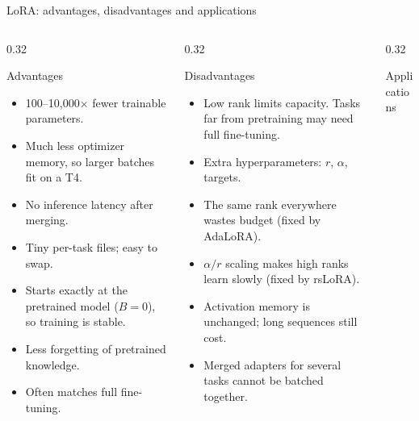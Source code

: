 \documentclass[aspectratio=169,11pt]{beamer}
\begin{document}
\begin{frame}{LoRA: advantages, disadvantages and applications}
  \begin{columns}[T]
    \begin{column}{0.32\textwidth}
      \begin{exampleblock}{Advantages}
        \scriptsize
        \begin{itemize}
          \item 100--10,000$\times$ fewer trainable parameters.
          \item Much less optimizer memory, so larger batches fit on a T4.
          \item No inference latency after merging.
          \item Tiny per-task files; easy to swap.
          \item Starts exactly at the pretrained model ($B=0$), so training is stable.
          \item Less forgetting of pretrained knowledge.
          \item Often matches full fine-tuning.
        \end{itemize}
      \end{exampleblock}
    \end{column}
    \begin{column}{0.32\textwidth}
      \begin{alertblock}{Disadvantages}
        \scriptsize
        \begin{itemize}
          \item Low rank limits capacity. Tasks far from pretraining may need full fine-tuning.
          \item Extra hyperparameters: $r$, $\alpha$, targets.
          \item The same rank everywhere wastes budget (fixed by AdaLoRA).
          \item $\alpha/r$ scaling makes high ranks learn slowly (fixed by rsLoRA).
          \item Activation memory is unchanged; long sequences still cost.
          \item Merged adapters for several tasks cannot be batched together.
        \end{itemize}
      \end{alertblock}
    \end{column}
    \begin{column}{0.32\textwidth}
      \begin{block}{Applications}
        \scriptsize

\end{block}
\end{column}
\end{columns}
\end{frame}
\end{document}
